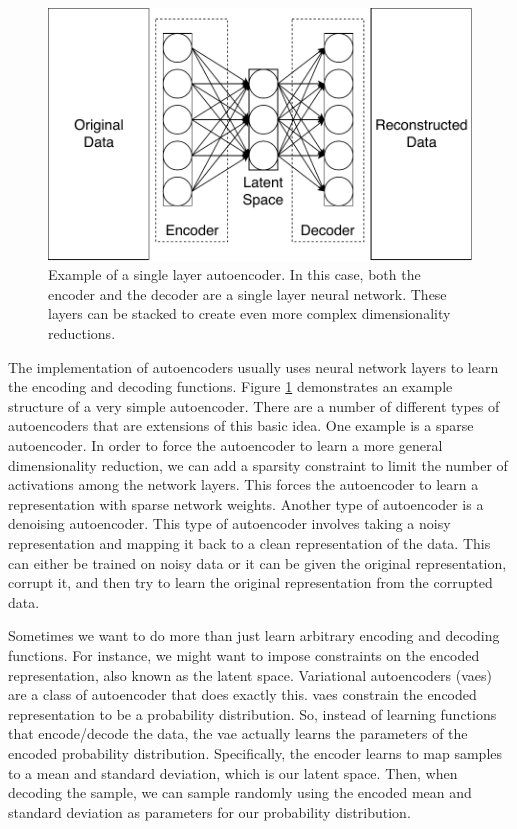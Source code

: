 \begin{figure}[t!]
\begin{center}
\includegraphics{figs/Autoencoder.pdf}
\caption{Example of a single layer autoencoder.
In this case, both the encoder and the decoder are a single layer neural network.
These layers can be stacked to create even more complex dimensionality reductions.}
\end{center}
\label{fig:ae}
\end{figure}

The implementation of autoencoders usually uses neural network layers to learn the encoding and decoding functions.
Figure \ref{fig:ae} demonstrates an example structure of a very simple autoencoder.
There are a number of different types of autoencoders that are extensions of this basic idea.
One example is a sparse autoencoder.
In order to force the autoencoder to learn a more general dimensionality reduction, we can add a sparsity constraint to limit the number of activations among the network layers.
This forces the autoencoder to learn a representation with sparse network weights.
Another type of autoencoder is a denoising autoencoder.
This type of autoencoder involves taking a noisy representation and mapping it back to a clean representation of the data.
This can either be trained on noisy data or it can be given the original representation, corrupt it, and then try to learn the original representation from the corrupted data.

Sometimes we want to do more than just learn arbitrary encoding and decoding functions.
For instance, we might want to impose constraints on the encoded representation, also known as the latent space.
Variational autoencoders (\glspl{vae}) are a class of autoencoder that does exactly this.
\glspl{vae} constrain the encoded representation to be a probability distribution.
So, instead of learning functions that encode/decode the data, the \gls{vae} actually learns the parameters of the encoded probability distribution.
Specifically, the encoder learns to map samples to a mean and standard deviation, which is our latent space.
Then, when decoding the sample, we can sample randomly using the encoded mean and standard deviation as parameters for our probability distribution.

